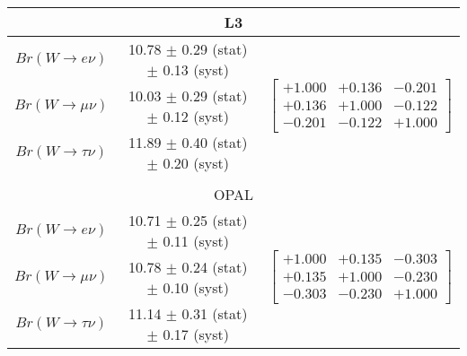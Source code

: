\begin{table}[!ht]
{\begin{tabular}{ |c| c  c | }
         
         \hline
         \multicolumn{3}{|c|}{L3 \cite{Achard:2004zw}} \\
         \hline
         $Br(W\to e    \nu)$    & 10.78 $\pm$ 0.29 (stat) $\pm$ 0.13 (syst) & 
         \multirow{3}{*}{
            \begin{footnotesize}
            $\begin{bmatrix}
                +1.000 &+0.136 &-0.201 \\ 
                +0.136 &+1.000 &-0.122 \\
                -0.201 &-0.122 &+1.000 
            \end{bmatrix}$ 
            \end{footnotesize} 
         } \\
         $Br(W\to \mu  \nu)$    & 10.03 $\pm$ 0.29 (stat) $\pm$ 0.12 (syst) & \\ 
         $Br(W\to \tau \nu)$    & 11.89 $\pm$ 0.40 (stat) $\pm$ 0.20 (syst) & \\
         \hline
         
         \multicolumn{3}{c}{} \\
         
         \hline
         \multicolumn{3}{|c|}{OPAL \cite{Abbiendi:2007rs}} \\
         \hline
         $Br(W\to e    \nu)$    & 10.71 $\pm$ 0.25 (stat) $\pm$ 0.11 (syst) & 
         \multirow{3}{*}{
            \begin{footnotesize}
            $\begin{bmatrix}
                +1.000 &+0.135 &-0.303 \\ 
                +0.135 &+1.000 &-0.230 \\
                -0.303 &-0.230 &+1.000 
            \end{bmatrix}$ 
            \end{footnotesize} 
         } \\
         $Br(W\to \mu  \nu)$    & 10.78 $\pm$ 0.24 (stat) $\pm$ 0.10 (syst) & \\ 
         $Br(W\to \tau \nu)$    & 11.14 $\pm$ 0.31 (stat) $\pm$ 0.17 (syst) & \\
         \hline
         

\end{tabular}}
\end{table}
